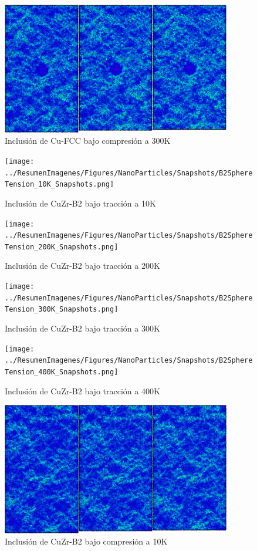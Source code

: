 \begin{figure}[htp]
\centering
\includegraphics[width=10cm]{../ResumenImagenes/Figures/NanoParticles/Snapshots/cuSphereCompression_300K_Snapshots.png}
\caption{Inclusión de Cu-FCC bajo compresión a 300K}
\label{C4:fg:snapshot_comp_FCC_300K}
\end{figure}

\begin{figure}[htp]
\centering
\texttt{[image: ../ResumenImagenes/Figures/NanoParticles/Snapshots/B2SphereTension\_10K\_Snapshots.png]}
\caption{Inclusión de CuZr-B2 bajo tracción a 10K}
\label{C4:fg:snapshot_ten_B2_10K}
\end{figure}

\begin{figure}[htp]
\centering
\texttt{[image: ../ResumenImagenes/Figures/NanoParticles/Snapshots/B2SphereTension\_200K\_Snapshots.png]}
\caption{Inclusión de CuZr-B2 bajo tracción a 200K}
\label{C4:fg:snapshot_ten_B2_200K}
\end{figure}

\begin{figure}[htp]
\centering
\texttt{[image: ../ResumenImagenes/Figures/NanoParticles/Snapshots/B2SphereTension\_300K\_Snapshots.png]}
\caption{Inclusión de CuZr-B2 bajo tracción a 300K}
\label{C4:fg:snapshot_ten_B2_300K}
\end{figure}

\clearpage

\begin{figure}[htp]
\centering
\texttt{[image: ../ResumenImagenes/Figures/NanoParticles/Snapshots/B2SphereTension\_400K\_Snapshots.png]}
\caption{Inclusión de CuZr-B2 bajo tracción a 400K}
\label{C4:fg:snapshot_ten_B2_400K}
\end{figure}

\begin{figure}[htp]
\centering
\includegraphics[width=10cm]{../ResumenImagenes/Figures/NanoParticles/Snapshots/B2SphereCompression_10K_Snapshots.png}
\caption{Inclusión de CuZr-B2 bajo compresión a 10K}
\label{C4:fg:snapshot_comp_B2_10K}
\end{figure}

